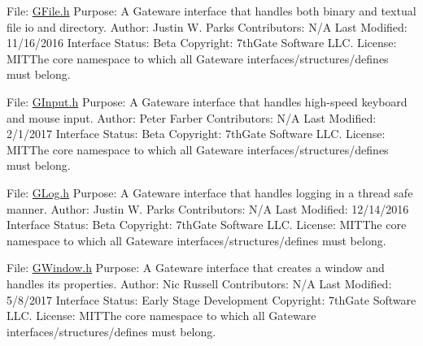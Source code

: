 File\+: \hyperlink{GFile_8h_source}{G\+File.\+h} Purpose\+: A Gateware interface that handles both binary and textual file io and directory. Author\+: Justin W. Parks Contributors\+: N/A Last Modified\+: 11/16/2016 Interface Status\+: Beta Copyright\+: 7th\+Gate Software L\+LC. License\+: M\+I\+T\+The core namespace to which all Gateware interfaces/structures/defines must belong.

File\+: \hyperlink{GInput_8h_source}{G\+Input.\+h} Purpose\+: A Gateware interface that handles high-\/speed keyboard and mouse input. Author\+: Peter Farber Contributors\+: N/A Last Modified\+: 2/1/2017 Interface Status\+: Beta Copyright\+: 7th\+Gate Software L\+LC. License\+: M\+I\+T\+The core namespace to which all Gateware interfaces/structures/defines must belong.

File\+: \hyperlink{GLog_8h_source}{G\+Log.\+h} Purpose\+: A Gateware interface that handles logging in a thread safe manner. Author\+: Justin W. Parks Contributors\+: N/A Last Modified\+: 12/14/2016 Interface Status\+: Beta Copyright\+: 7th\+Gate Software L\+LC. License\+: M\+I\+T\+The core namespace to which all Gateware interfaces/structures/defines must belong.

File\+: \hyperlink{GWindow_8h_source}{G\+Window.\+h} Purpose\+: A Gateware interface that creates a window and handles its properties. Author\+: Nic Russell Contributors\+: N/A Last Modified\+: 5/8/2017 Interface Status\+: Early Stage Development Copyright\+: 7th\+Gate Software L\+LC. License\+: M\+I\+T\+The core namespace to which all Gateware interfaces/structures/defines must belong. 